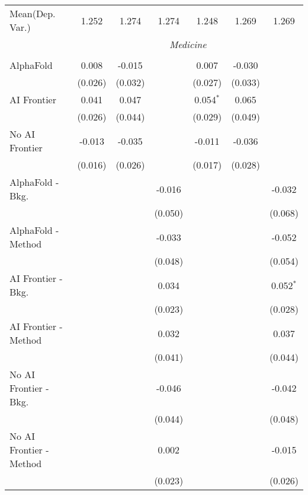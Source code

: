 \begin{tabular}{lcccccc}
Mean(Dep. Var.) & 1.252 & 1.274 & 1.274 & 1.248 & 1.269 & 1.269 \\
 & \multicolumn{6}{c}{\textit{Medicine}} \\ \\
   AlphaFold               & 0.008   & -0.015  &         & 0.007       & -0.030  &   \\   
                           & (0.026) & (0.032) &         & (0.027)     & (0.033) &   \\   
   AI Frontier             & 0.041   & 0.047   &         & 0.054$^{*}$ & 0.065   &   \\   
                           & (0.026) & (0.044) &         & (0.029)     & (0.049) &   \\   
   No AI Frontier          & -0.013  & -0.035  &         & -0.011      & -0.036  &   \\   
                           & (0.016) & (0.026) &         & (0.017)     & (0.028) &   \\   
   AlphaFold - Bkg.        &         &         & -0.016  &             &         & -0.032\\   
                           &         &         & (0.050) &             &         & (0.068)\\   
   AlphaFold - Method      &         &         & -0.033  &             &         & -0.052\\   
                           &         &         & (0.048) &             &         & (0.054)\\   
   AI Frontier - Bkg.      &         &         & 0.034   &             &         & 0.052$^{*}$\\   
                           &         &         & (0.023) &             &         & (0.028)\\   
   AI Frontier - Method    &         &         & 0.032   &             &         & 0.037\\   
                           &         &         & (0.041) &             &         & (0.044)\\   
   No AI Frontier - Bkg.   &         &         & -0.046  &             &         & -0.042\\   
                           &         &         & (0.044) &             &         & (0.048)\\   
   No AI Frontier - Method &         &         & 0.002   &             &         & -0.015\\   
                           &         &         & (0.023) &             &         & (0.026)\\   

\end{tabular}
